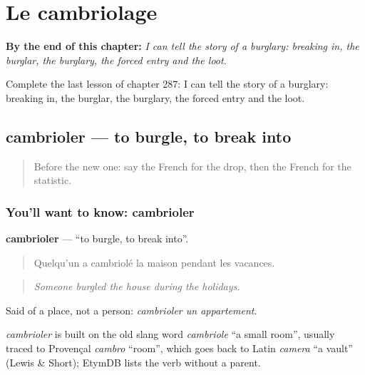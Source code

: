 
\chapter{Le cambriolage}
\label{ch:fr-le-cambriolage}

\begin{chapteropening}
\textbf{By the end of this chapter:} \emph{I can tell the story of a burglary: breaking in, the burglar, the burglary, the forced entry and the loot.}

Complete the last lesson of chapter 287: I can tell the story of a burglary: breaking in, the burglar, the burglary, the forced entry and the loot.
\end{chapteropening}

\section[cambrioler]{cambrioler — to burgle, to break into}

\label{lesson:FR-C287-cambrioler}



\begin{quote}
Before the new one: say the French for the drop, then the French for the statistic.
\end{quote}

\subsection*{You'll want to know: cambrioler}
\textbf{cambrioler} — \textquotedblleft{}to burgle, to break into\textquotedblright{}.

\begin{quote}
Quelqu'un a cambriolé la maison pendant les vacances.
\end{quote}

\begin{quote}
\emph{Someone burgled the house during the holidays.}
\end{quote}

Said of a place, not a person: \emph{cambrioler un appartement}.

\begin{cousinweb}
\emph{cambrioler} is built on the old slang word \emph{cambriole} \textquotedblleft{}a small room\textquotedblright{}, usually traced to Provençal \emph{cambro} \textquotedblleft{}room\textquotedblright{}, which goes back to Latin \emph{camera} \textquotedblleft{}a vault\textquotedblright{} (Lewis \& Short); EtymDB lists the verb without a parent.
\end{cousinweb}


